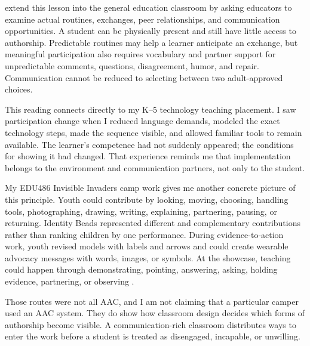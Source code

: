 
\citet{downing2015classroom} extend this lesson into the general education classroom by asking educators to examine actual routines, exchanges, peer relationships, and communication opportunities. A student can be physically present and still have little access to authorship. Predictable routines may help a learner anticipate an exchange, but meaningful participation also requires vocabulary and partner support for unpredictable comments, questions, disagreement, humor, and repair. Communication cannot be reduced to selecting between two adult-approved choices.

This reading connects directly to my K--5 technology teaching placement. I saw participation change when I reduced language demands, modeled the exact technology steps, made the sequence visible, and allowed familiar tools to remain available. The learner's competence had not suddenly appeared; the conditions for showing it had changed. That experience reminds me that implementation belongs to the environment and communication partners, not only to the student.

My EDU486 Invisible Invaders camp work gives me another concrete picture of this principle. Youth could contribute by looking, moving, choosing, handling tools, photographing, drawing, writing, explaining, partnering, pausing, or returning. Identity Beads represented different and complementary contributions rather than ranking children by one performance. During evidence-to-action work, youth revised models with labels and arrows and could create wearable advocacy messages with words, images, or symbols. At the showcase, teaching could happen through demonstrating, pointing, answering, asking, holding evidence, partnering, or observing \citep{campEvidence2026}.

Those routes were not all AAC, and I am not claiming that a particular camper used an AAC system. They do show how classroom design decides which forms of authorship become visible. A communication-rich classroom distributes ways to enter the work before a student is treated as disengaged, incapable, or unwilling.
